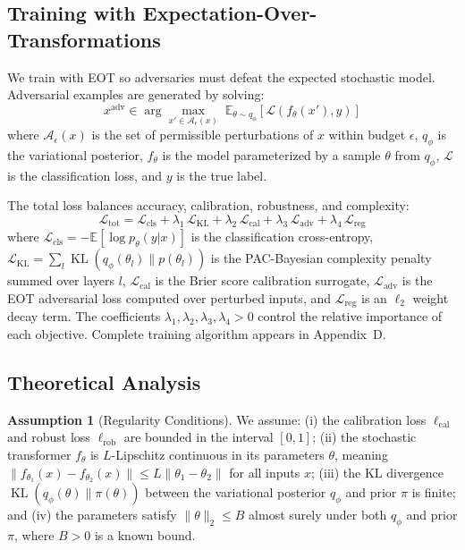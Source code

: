 \documentclass[12pt,a4paper]{article}
\theoremstyle{definition}
\newtheorem{assumption}[theorem]{Assumption}
\DeclareMathOperator{\KL}{KL}
\begin{document}
\subsection{Training with Expectation-Over-Transformations}

We train with EOT so adversaries must defeat the expected stochastic model. Adversarial examples are generated by solving:
\begin{equation}
\label{eq:eot}
x^{\text{adv}}
\in
\arg\max_{x'\in\mathcal{A}_\epsilon(x)}\;
\mathbb{E}_{\theta\sim q_\phi}[\mathcal{L}(f_\theta(x'),y)]
\end{equation}
where $\mathcal{A}_\epsilon(x)$ is the set of permissible perturbations of $x$ within budget $\epsilon$, $q_\phi$ is the variational posterior, $f_\theta$ is the model parameterized by a sample $\theta$ from $q_\phi$, $\mathcal{L}$ is the classification loss, and $y$ is the true label.

The total loss balances accuracy, calibration, robustness, and complexity:
\begin{equation}
\label{eq:total_loss}
\mathcal{L}_{\text{tot}}
=
\mathcal{L}_{\text{cls}}
+\lambda_{1}\,\mathcal{L}_{\mathrm{KL}}
+\lambda_{2}\,\mathcal{L}_{\text{cal}}
+\lambda_{3}\,\mathcal{L}_{\text{adv}}
+\lambda_{4}\,\mathcal{L}_{\text{reg}}
\end{equation}
where $\mathcal{L}_{\text{cls}}=-\mathbb{E}[\log p_\theta(y|x)]$ is the classification cross-entropy, $\mathcal{L}_{\mathrm{KL}}=\sum_l \KL(q_\phi(\theta_l)\| p(\theta_l))$ is the PAC-Bayesian complexity penalty summed over layers $l$, $\mathcal{L}_{\text{cal}}$ is the Brier score calibration surrogate, $\mathcal{L}_{\text{adv}}$ is the EOT adversarial loss computed over perturbed inputs, and $\mathcal{L}_{\text{reg}}$ is an $\ell_2$ weight decay term. The coefficients $\lambda_1, \lambda_2, \lambda_3, \lambda_4 > 0$ control the relative importance of each objective. Complete training algorithm appears in Appendix~D.

\subsection{Theoretical Analysis}

\begin{assumption}[Regularity Conditions]
\label{assump:regularity}
We assume: (i) the calibration loss $\ell_{\text{cal}}$ and robust loss $\ell_{\text{rob}}$ are bounded in the interval $[0,1]$; (ii) the stochastic transformer $f_\theta$ is $L$-Lipschitz continuous in its parameters $\theta$, meaning $\|f_{\theta_1}(x) - f_{\theta_2}(x)\| \leq L \|\theta_1 - \theta_2\|$ for all inputs $x$; (iii) the KL divergence $\KL(q_\phi(\theta) \| \pi(\theta))$ between the variational posterior $q_\phi$ and prior $\pi$ is finite; and (iv) the parameters satisfy $\|\theta\|_2 \le B$ almost surely under both $q_\phi$ and prior $\pi$, where $B > 0$ is a known bound.
\end{assumption}
\end{document}
